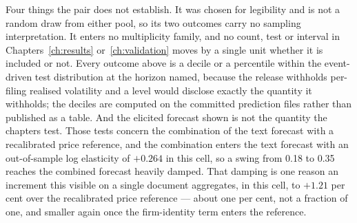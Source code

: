 Four things the pair does not establish. It was chosen for legibility and is
not a random draw from either pool, so its two outcomes carry no sampling
interpretation. It enters no multiplicity family, and no count, test or
interval in Chapters~\ref{ch:results} or~\ref{ch:validation} moves by a single
unit whether it is included or not. Every outcome above is a decile or a
percentile within the event-driven test distribution at the horizon named,
because the release withholds per-filing realised volatility and a level would
disclose exactly the quantity it withholds; the deciles are computed on the
committed prediction files rather than published as a table. %
And the elicited forecast shown is not the quantity the chapters test. Those
tests concern the combination of the text forecast with a recalibrated price
reference, and the combination enters the text forecast with an
out-of-sample log elasticity of $+0.264$ in this cell, so a swing from 0.18 to
0.35 reaches the combined forecast heavily damped. %
That damping is one reason an increment this visible on a single document
aggregates, in this cell, to $+1.21$ per cent over the recalibrated price
reference --- about one per cent, not a fraction of one, and smaller again once
the firm-identity term enters the reference. %

\clearpage
